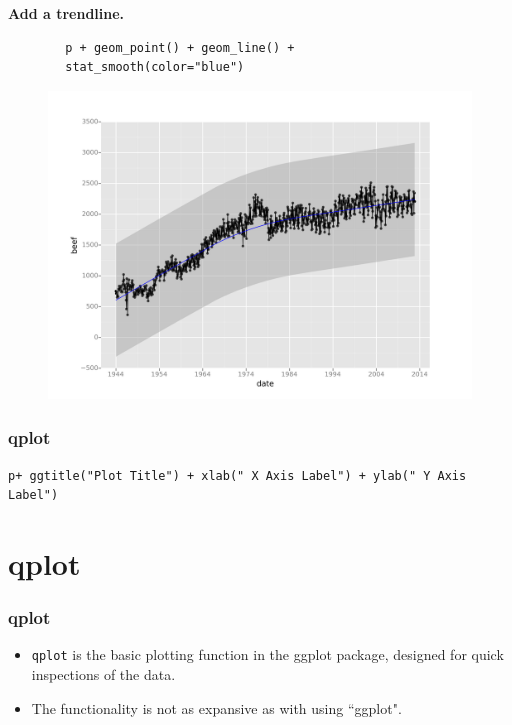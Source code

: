 \documentclass{beamer}
\begin{document}
\begin{frame}[fragile]
\textbf{	Add a trendline.}
	\begin{framed}
		\begin{verbatim}
		p + geom_point() + geom_line() +
		stat_smooth(color="blue")
		\end{verbatim}
	\end{framed}
	\begin{figure}
		\centering
		\includegraphics[width=0.7\linewidth]{layers4}
	\end{figure}
\end{frame}

\begin{frame}
\frametitle{qplot}
\Large
\begin{framed}
\begin{verbatim}
p+ ggtitle("Plot Title") + xlab(" X Axis Label") + ylab(" Y Axis Label")

\end{verbatim}
\end{framed}
\end{frame}
\section{qplot}

\begin{frame}
\frametitle{qplot}
	\Large
\begin{itemize}
\item \texttt{qplot} is the basic plotting function in the ggplot package, designed for quick inspections of the data.
\item The functionality is not as expansive as with using ``ggplot".
\end{itemize}

\end{frame}
\end{document}
